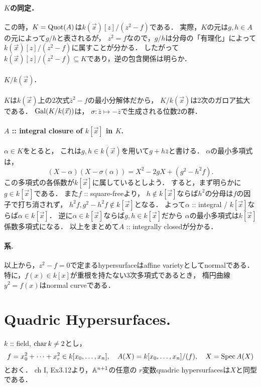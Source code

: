 \documentclass[a4paper]{jsarticle}
\begin{document}
    \paragraph{$K$の同定．}
    この時，$K=\operatorname{Quot}(A)$は$k(\vec{x})[z]/(z^2-f)$である．
    実際，$K$の元は$g,h \in A$の元によって$g/h$と表されるが，
    $z^2=f$なので，$g/h$は分母の「有理化」によって$k(\vec{x})[z]/(z^2-f)$に属すことが分かる．
    したがって$k(\vec{x})[z]/(z^2-f) \subseteq K$であり，逆の包含関係は明らか．

    \paragraph{$K/k(\vec{x})$.}
    $K$は$k(\vec{x})$上の2次式$\bar{z}^2-f$の最小分解体だから，
    $K/k(\vec{x})$は2次のガロア拡大である．
    $\operatorname{Gal}(K/k(\vec{x}))$は，
    $\sigma: \bar{z} \mapsto -\bar{z}$で生成される位数$2$の群．

    \paragraph{$A$ :: integral closure of $k[\vec{x}]$ in $K$.}
    $\alpha \in K$をとると，
    これは$g,h \in k(\vec{x})$を用いて$g+h\bar{z}$と書ける．
    $\alpha$の最小多項式は，
    \[ (X-\alpha)(X-\sigma(\alpha))=X^2-2gX + (g^2 - h^2 f). \]
    この多項式の各係数が$k[\vec{x}]$に属しているとしよう．
    すると，まず明らかに$g \in k[\vec{x}]$である．
    また$f$ :: square-freeより，
    $h \not \in k[\vec{x}]$ならば$h^2$の分母は$f$の因子で打ち消されず，
    $h^2 f, g^2 - h^2 f\not \in k[\vec{x}]$となる．
    よって$\alpha$ :: integral / $k[\vec{x}]$ならば$\alpha \in k[\vec{x}]$．
    逆に$\alpha \in k[\vec{x}]$ならば$g,h \in k[\vec{x}]$だから
    $\alpha$の最小多項式は$k[\vec{x}]$係数多項式になる．
    以上をまとめて$A$ :: integrally closedが分かる．

    \paragraph{系.}
    以上から，$z^2-f=0$で定まるhypersurfaceはaffine varietyとしてnormalである．
    特に，$f(x) \in k[x]$が重根を持たない$3$次多項式であるとき，
    楕円曲線$y^2=f(x)$はnormal curveである．

\section{Quadric Hypersurfaces.} %
    $k$ :: field, $\operatorname{char} k \neq 2$とし，
    \[
        f=x_0^2+\dots+x_r^2 \in k[x_0, \dots, x_n],~~~
        A(X)=k[x_0,\dots,x_n]/(f),~~~
        X=\operatorname{Spec} A(X)
    \]
    とおく．
    ch I, Ex3.12より，$\mathbb{A}^{n+1}$の任意の
    $r$変数quadric hypersurfacesは$X$と同型である．
\end{document}
